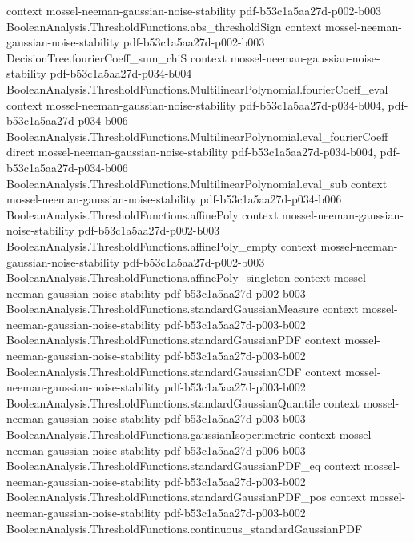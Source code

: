\begin{theorem}
  {context}
  {mossel-neeman-gaussian-noise-stability}
  {pdf-b53c1a5aa27d-p002-b003}
\proofstep
  {BooleanAnalysis.ThresholdFunctions.abs_thresholdSign}
  {context}
  {mossel-neeman-gaussian-noise-stability}
  {pdf-b53c1a5aa27d-p002-b003}
\proofstep
  {DecisionTree.fourierCoeff_sum_chiS}
  {context}
  {mossel-neeman-gaussian-noise-stability}
  {pdf-b53c1a5aa27d-p034-b004}
\proofstep
  {BooleanAnalysis.ThresholdFunctions.MultilinearPolynomial.fourierCoeff_eval}
  {context}
  {mossel-neeman-gaussian-noise-stability}
  {pdf-b53c1a5aa27d-p034-b004,
    pdf-b53c1a5aa27d-p034-b006}
\proofstep
  {BooleanAnalysis.ThresholdFunctions.MultilinearPolynomial.eval_fourierCoeff}
  {direct}
  {mossel-neeman-gaussian-noise-stability}
  {pdf-b53c1a5aa27d-p034-b004,
    pdf-b53c1a5aa27d-p034-b006}
\proofstep
  {BooleanAnalysis.ThresholdFunctions.MultilinearPolynomial.eval_sub}
  {context}
  {mossel-neeman-gaussian-noise-stability}
  {pdf-b53c1a5aa27d-p034-b006}
\proofstep
  {BooleanAnalysis.ThresholdFunctions.affinePoly}
  {context}
  {mossel-neeman-gaussian-noise-stability}
  {pdf-b53c1a5aa27d-p002-b003}
\proofstep
  {BooleanAnalysis.ThresholdFunctions.affinePoly_empty}
  {context}
  {mossel-neeman-gaussian-noise-stability}
  {pdf-b53c1a5aa27d-p002-b003}
\proofstep
  {BooleanAnalysis.ThresholdFunctions.affinePoly_singleton}
  {context}
  {mossel-neeman-gaussian-noise-stability}
  {pdf-b53c1a5aa27d-p002-b003}
\proofstep
  {BooleanAnalysis.ThresholdFunctions.standardGaussianMeasure}
  {context}
  {mossel-neeman-gaussian-noise-stability}
  {pdf-b53c1a5aa27d-p003-b002}
\proofstep
  {BooleanAnalysis.ThresholdFunctions.standardGaussianPDF}
  {context}
  {mossel-neeman-gaussian-noise-stability}
  {pdf-b53c1a5aa27d-p003-b002}
\proofstep
  {BooleanAnalysis.ThresholdFunctions.standardGaussianCDF}
  {context}
  {mossel-neeman-gaussian-noise-stability}
  {pdf-b53c1a5aa27d-p003-b002}
\proofstep
  {BooleanAnalysis.ThresholdFunctions.standardGaussianQuantile}
  {context}
  {mossel-neeman-gaussian-noise-stability}
  {pdf-b53c1a5aa27d-p003-b003}
\proofstep
  {BooleanAnalysis.ThresholdFunctions.gaussianIsoperimetric}
  {context}
  {mossel-neeman-gaussian-noise-stability}
  {pdf-b53c1a5aa27d-p006-b003}
\proofstep
  {BooleanAnalysis.ThresholdFunctions.standardGaussianPDF_eq}
  {context}
  {mossel-neeman-gaussian-noise-stability}
  {pdf-b53c1a5aa27d-p003-b002}
\proofstep
  {BooleanAnalysis.ThresholdFunctions.standardGaussianPDF_pos}
  {context}
  {mossel-neeman-gaussian-noise-stability}
  {pdf-b53c1a5aa27d-p003-b002}
\proofstep
  {BooleanAnalysis.ThresholdFunctions.continuous_standardGaussianPDF}

\end{theorem}
